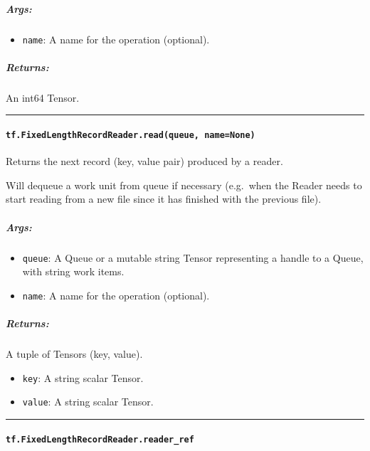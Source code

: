 \subparagraph{Args: }\label{args-38}

\begin{itemize}
\tightlist
\item
  \texttt{name}: A name for the operation (optional).
\end{itemize}

\subparagraph{Returns: }\label{returns-32}

An int64 Tensor.

\begin{center}\rule{0.5\linewidth}{\linethickness}\end{center}

\paragraph{\texorpdfstring{\texttt{tf.FixedLengthRecordReader.read(queue,\ name=None)}
}{tf.FixedLengthRecordReader.read(queue, name=None) }}\label{tf.fixedlengthrecordreader.readqueue-namenone}

Returns the next record (key, value pair) produced by a reader.

Will dequeue a work unit from queue if necessary (e.g.~when the Reader
needs to start reading from a new file since it has finished with the
previous file).

\subparagraph{Args: }\label{args-39}

\begin{itemize}
\tightlist
\item
  \texttt{queue}: A Queue or a mutable string Tensor representing a
  handle to a Queue, with string work items.
\item
  \texttt{name}: A name for the operation (optional).
\end{itemize}

\subparagraph{Returns: }\label{returns-33}

A tuple of Tensors (key, value).

\begin{itemize}
\tightlist
\item
  \texttt{key}: A string scalar Tensor.
\item
  \texttt{value}: A string scalar Tensor.
\end{itemize}

\begin{center}\rule{0.5\linewidth}{\linethickness}\end{center}

\paragraph{\texorpdfstring{\texttt{tf.FixedLengthRecordReader.reader\_ref}
}{tf.FixedLengthRecordReader.reader\_ref }}\label{tf.fixedlengthrecordreader.readerux5fref}

